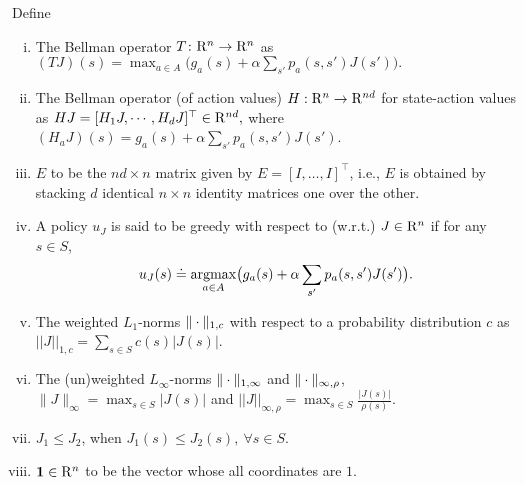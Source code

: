 \begin{definition}Define
\begin{comment}
Let $c,\rho,\chi:S \to \R_+$ be positive valued functions, where $\R_+$ denotes the set of strictly positive reals. Then for $J\in \R^n$, $a\in A$ and $s\in S$,
define
\end{comment}
\begin{enumerate}[(i)]
\item The Bellman operator $T\colon \mathrm{R}^n \rightarrow \mathrm{R}^n$ as $(TJ)(s)=\max_{a \in A}\big(g_a(s)+\alpha \sum_{s'} p_a(s,s')J(s')\big).
$
\item \label{bellactval} The Bellman operator (of action values) $H: \mathrm{R}^n \to \mathrm{R}^{nd}$ for state-action values as $HJ=[ H_1 J,\cdots,H_d J]^\top\in \mathrm{R}^{nd},$ where $(H_a J)(s)= g_a(s)+\alpha \sum_{s'}p_a(s,s') J(s')$.
\begin{comment}
\item
||J||_{\infty,\rho}=\max_{s \in S} \frac{|J(s)|}{\rho(s)}$.
\item The discounted maximal inflation of $\chi$ due to $P = (p_a)_{a\in A}$ as $\beta_{\chi}=\max_{s \in S} \frac{\underset{a \in A}{\max}\big(\alpha\sum_{s'}p_a(s,s')\chi(s')\big)}{\chi(s)}$.
\item The function $\chi:S\to\R_+$ above to be a \emph{Lyapunov} function for $P = (p_a)_{a\in A}$ if $\beta_{\chi}<1$.
\end{comment}
\item $E$ to be the $nd\times n$ matrix given by $E=[I,\ldots,I]^\top$, i.e., $E$ is obtained by stacking $d$ identical $n\times n$ identity matrices one over the other.
\item A policy $u_J$ is said to be greedy with respect to (w.r.t.) $J\in \mathrm{R}^n$ if for any $s\in S$,
\begin{align*}u_J(s)\doteq\underset{a\in A}{\operatorname{argmax}}\big(g_a(s)+\alpha \sum_{s'}p_a(s,s')J(s')\big).\end{align*}
\item The weighted $L_1$-norms $\|\cdot\|_{1,c}$ with respect to a probability distribution $c$ as $
||J||_{1,c}=\sum_{s \in S} c(s)|J(s)|$.
\item The (un)weighted $L_\infty$-norms $\|\cdot\|_{1,\infty}$
and $\|\cdot\|_{\infty,\rho}$, $\parallel J\parallel_{\infty}=\max_{s\in S}|J(s)|$ and $||J||_{\infty,\rho}=\max_{s \in S} \frac{|J(s)|}{\rho(s)}$.
\item $J_1\leq J_2$, when $J_1(s)\leq J_2(s),~\forall s\in S$.
\item $\mathbf{1}\in \mathrm{R}^n$ to be the vector whose all coordinates are $1$.
\end{enumerate}
\end{definition}
